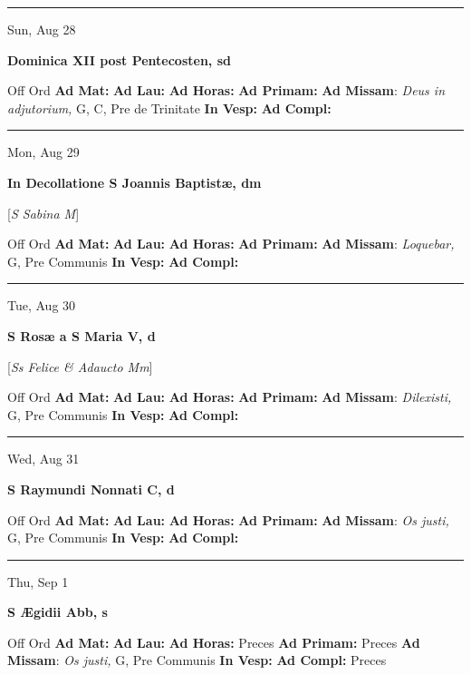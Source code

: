 \documentclass[letterpaper, 10pt]{article}
\begin{document}
\hrule
\begin{center}
Sun, Aug 28
\end{center}\textbf{ \large Dominica XII post Pentecosten, \textnormal{\normalsize sd}}
\begin{justify}
Off Ord
\textbf{Ad Mat: }
\textbf{Ad Lau: }
\textbf{Ad Horas: }
\textbf{Ad Primam: }
\textbf{Ad Missam}: \textit{Deus in adjutorium,} G, C, Pre de Trinitate
\textbf{In Vesp: }
\textbf{Ad Compl: }\end{justify}



\hrule
\begin{center}
Mon, Aug 29
\end{center}\textbf{ \large In Decollatione S Joannis Baptistæ, \textnormal{\normalsize dm}}

[\textit{S Sabina M}]
\begin{justify}
Off Ord
\textbf{Ad Mat: }
\textbf{Ad Lau: }
\textbf{Ad Horas: }
\textbf{Ad Primam: }
\textbf{Ad Missam}: \textit{Loquebar,} G, Pre Communis
\textbf{In Vesp: }
\textbf{Ad Compl: }\end{justify}



\hrule
\begin{center}
Tue, Aug 30
\end{center}\textbf{ \large S Rosæ a S Maria V, \textnormal{\normalsize d}}

[\textit{Ss Felice \& Adaucto Mm}]
\begin{justify}
Off Ord
\textbf{Ad Mat: }
\textbf{Ad Lau: }
\textbf{Ad Horas: }
\textbf{Ad Primam: }
\textbf{Ad Missam}: \textit{Dilexisti,} G, Pre Communis
\textbf{In Vesp: }
\textbf{Ad Compl: }\end{justify}



\hrule
\begin{center}
Wed, Aug 31
\end{center}\textbf{ \large S Raymundi Nonnati C, \textnormal{\normalsize d}}
\begin{justify}
Off Ord
\textbf{Ad Mat: }
\textbf{Ad Lau: }
\textbf{Ad Horas: }
\textbf{Ad Primam: }
\textbf{Ad Missam}: \textit{Os justi,} G, Pre Communis
\textbf{In Vesp: }
\textbf{Ad Compl: }\end{justify}



\hrule
\begin{center}
Thu, Sep 1
\end{center}\textbf{ \large S Ægidii Abb, \textnormal{\normalsize s}}
\begin{justify}
Off Ord
\textbf{Ad Mat: }
\textbf{Ad Lau: }
\textbf{Ad Horas: }Preces
\textbf{Ad Primam: }Preces
\textbf{Ad Missam}: \textit{Os justi,} G, Pre Communis
\textbf{In Vesp: }
\textbf{Ad Compl: }Preces\end{justify}
\end{document}
